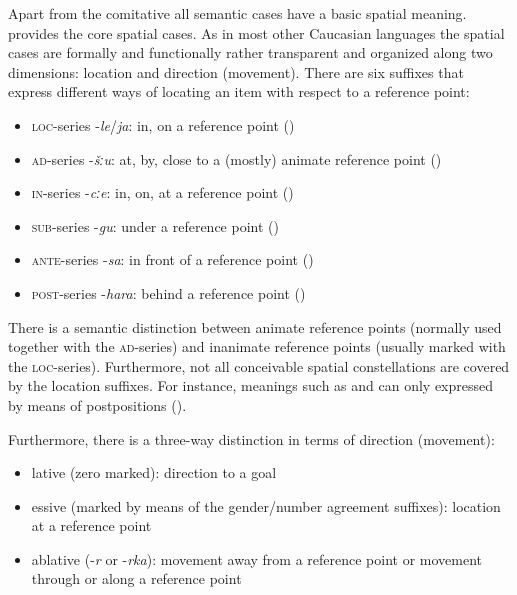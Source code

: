 Apart from the comitative all semantic cases have a basic spatial meaning.  provides the core spatial cases. As in most other Caucasian languages the spatial cases are formally and functionally rather transparent and organized along two dimensions: location and direction (movement). There are six suffixes that express different ways of locating an item with respect to a reference point: 
%
\begin{itemize}
	\item \textsc{loc}-series -\textit{le}\slash\textit{ja}: in, on a reference point ()
	\item \textsc{ad}-series -\textit{šːu}: at, by, close to a (mostly) animate reference point ()
	\item \textsc{in}-series -\textit{cːe}: in, on, at a reference point ()
	\item \textsc{sub}-series -\textit{gu}: under a reference point ()
	\item \textsc{ante}-series -\textit{sa}: in front of a reference point ()
	\item \textsc{post}-series -\textit{hara}: behind a reference point ()
\end{itemize}


There is a semantic distinction between animate reference points (normally used together with the \textsc{ad}-series) and inanimate reference points (usually marked with the \textsc{loc}-series). Furthermore, not all conceivable spatial constellations are covered by the location suffixes. For instance, meanings such as  and  can only expressed by means of postpositions ().

Furthermore, there is a three-way distinction in terms of direction (movement):
%
\begin{itemize}
	\item lative (zero marked): direction to a goal
	\item essive (marked by means of the gender/number agreement suffixes): location at a reference point
	\item ablative (-\textit{r} or -\textit{rka}): movement away from a reference point or movement through or along a reference point
\end{itemize}

